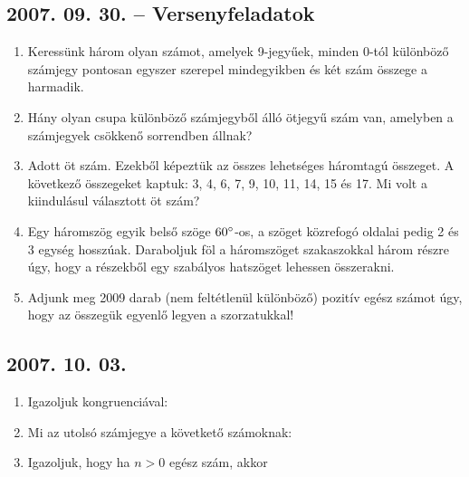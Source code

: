 \subsection*{2007. 09. 30. -- Versenyfeladatok}
\begin{enumerate}
\item Keressünk három olyan számot, amelyek 9-jegyűek, minden 0-tól különböző számjegy pontosan egyszer szerepel mindegyikben és két szám összege a harmadik.
\item Hány olyan csupa különböző számjegyből álló ötjegyű szám van, amelyben a számjegyek csökkenő sorrendben állnak?
\item Adott öt szám. Ezekből képeztük az összes lehetséges háromtagú összeget. A következő összegeket kaptuk: 3, 4, 6, 7, 9, 10, 11, 14, 15 és 17. Mi volt a kiindulásul választott öt szám?
\item Egy háromszög egyik belső szöge $60^\circ$-os, a szöget közrefogó oldalai pedig 2 és 3 egység hosszúak. Daraboljuk föl a háromszöget szakaszokkal három részre úgy, hogy a részekből egy szabályos hatszöget lehessen összerakni.
\item Adjunk meg 2009 darab (nem feltétlenül különböző) pozitív egész számot úgy, hogy az összegük egyenlő legyen a szorzatukkal!
\end{enumerate}


\subsection*{2007. 10. 03.}
\begin{enumerate}
\item Igazoljuk kongruenciával:
\item Mi az utolsó számjegye a követkető számoknak:
\item Igazoljuk, hogy ha $n>0$ egész szám, akkor
\end{enumerate}


